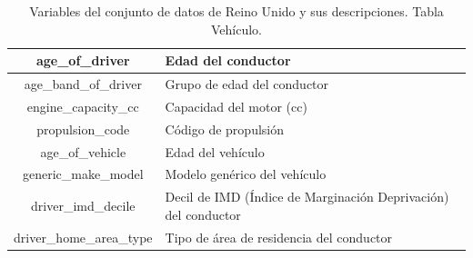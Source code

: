 \documentclass{uathesis-es}
\begin{document}
{\begin{table}[H]
\begin{center}
\begin{tabular}{|c|l|}
            age\_of\_driver & Edad del conductor \\ \hline
            age\_band\_of\_driver & Grupo de edad del conductor \\ \hline
            engine\_capacity\_cc & Capacidad del motor (cc) \\ \hline
            propulsion\_code & Código de propulsión \\ \hline
            age\_of\_vehicle & Edad del vehículo \\ \hline
            generic\_make\_model & Modelo genérico del vehículo \\ \hline
            driver\_imd\_decile & Decil de IMD (Índice de Marginación Deprivación) del conductor \\ \hline
            driver\_home\_area\_type & Tipo de área de residencia del conductor \\ \hline
        \end{tabular}
    \end{center}
    \caption{Variables del conjunto de datos de Reino Unido y sus descripciones. Tabla Vehículo.}
    \label{UK_VEHICLE_TABLE}
\end{table}

}
\end{document}
